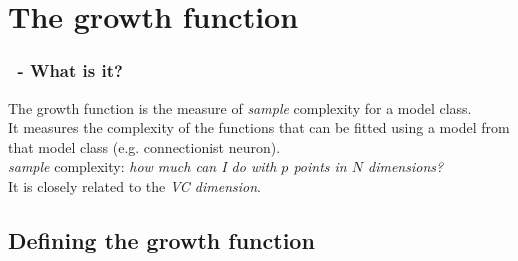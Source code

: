 \section{The growth function}


\begin{frame}\frametitle{\secname~- What is it?}

The growth function is the measure of \emph{sample} complexity for a model class.\\[5mm]

It measures the complexity of the functions that can be fitted using a model from that model class (e.g. connectionist neuron).\\[5mm]

\emph{sample} complexity: \emph{how much can I do with $p$ points in $N$ dimensions?}\\[10mm]

It is closely related to the \emph{VC dimension}.

\end{frame}

\subsection{Defining the growth function}

